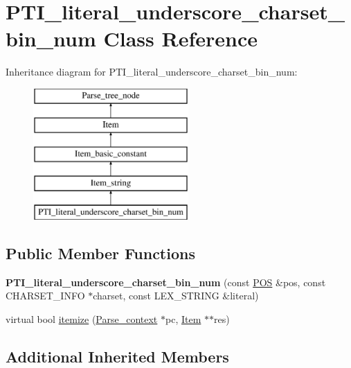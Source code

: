 \hypertarget{classPTI__literal__underscore__charset__bin__num}{}\section{P\+T\+I\+\_\+literal\+\_\+underscore\+\_\+charset\+\_\+bin\+\_\+num Class Reference}
\label{classPTI__literal__underscore__charset__bin__num}
Inheritance diagram for P\+T\+I\+\_\+literal\+\_\+underscore\+\_\+charset\+\_\+bin\+\_\+num\+:\begin{figure}[H]
\begin{center}
\leavevmode
\includegraphics[height=5.000000cm]{classPTI__literal__underscore__charset__bin__num}
\end{center}
\end{figure}
\subsection*{Public Member Functions}
\begin{DoxyCompactItemize}
\item 
\mbox{\label{classPTI__literal__underscore__charset__bin__num_af1112ce70586774bb09236875b7f531d}} 
{\bfseries P\+T\+I\+\_\+literal\+\_\+underscore\+\_\+charset\+\_\+bin\+\_\+num} (const \mbox{\hyperlink{structYYLTYPE}{P\+OS}} \&pos, const C\+H\+A\+R\+S\+E\+T\+\_\+\+I\+N\+FO $\ast$charset, const L\+E\+X\+\_\+\+S\+T\+R\+I\+NG \&literal)
\item 
virtual bool \mbox{\hyperlink{classPTI__literal__underscore__charset__bin__num_a83c8ef224919d7929abe09b73e054476}{itemize}} (\mbox{\hyperlink{structParse__context}{Parse\+\_\+context}} $\ast$pc, \mbox{\hyperlink{classItem}{Item}} $\ast$$\ast$res)
\end{DoxyCompactItemize}
\subsection*{Additional Inherited Members}


